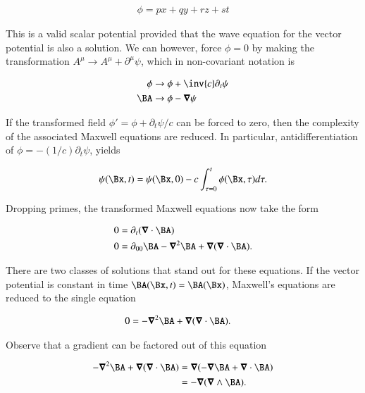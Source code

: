 \begin{align}
\label{eqn:ftMaxVacuum:23}
\phi = p x + q y + r z + s t
\end{align}

This is a valid scalar potential provided that the wave equation for the vector potential is also a solution.  We can however, force $\phi = 0$ by making the transformation $A^\mu \rightarrow A^\mu + \partial^\mu \psi$, which in non-covariant notation is

\begin{align}
\label{eqn:ftMaxVacuum:24}
\phi &\rightarrow \phi + \inv{c} \partial_t \psi \\
\BA &\rightarrow \phi - \spacegrad \psi
\end{align}

If the transformed field $\phi' = \phi + \partial_t \psi/c$ can be forced to zero, then the complexity of the associated Maxwell equations are reduced.  In particular, antidifferentiation of $\phi = -(1/c) \partial_t \psi$, yields

\begin{align}
\label{eqn:ftMaxVacuum:25}
\psi(\Bx,t) = \psi(\Bx, 0) - c \int_{\tau=0}^t \phi(\Bx, \tau) d\tau.
\end{align}

Dropping primes, the transformed Maxwell equations now take the form

\begin{subequations}
\label{eqn:ftMaxVacuum:26}
\begin{align}
0 &= \partial_t( \spacegrad \cdot \BA )
\label{eqn:ftMaxVacuum:26a}
\\
0 &=
\partial_{00} \BA - \spacegrad^2 \BA + \spacegrad (\spacegrad \cdot \BA ).
\label{eqn:ftMaxVacuum:26b}
\end{align}
\end{subequations}

There are two classes of solutions that stand out for these equations.  If the vector potential is constant in time $\BA(\Bx,t) = \BA(\Bx)$, Maxwell's equations are reduced to the single equation

\begin{align}
\label{eqn:ftMaxVacuum:28}
0
&= - \spacegrad^2 \BA + \spacegrad (\spacegrad \cdot \BA ).
\end{align}

Observe that a gradient can be factored out of this equation

\begin{align*}
- \spacegrad^2 \BA + \spacegrad (\spacegrad \cdot \BA )
&=
\spacegrad (-\spacegrad \BA + \spacegrad \cdot \BA ) \\
&=
-\spacegrad (\spacegrad \wedge \BA).
\end{align*}

